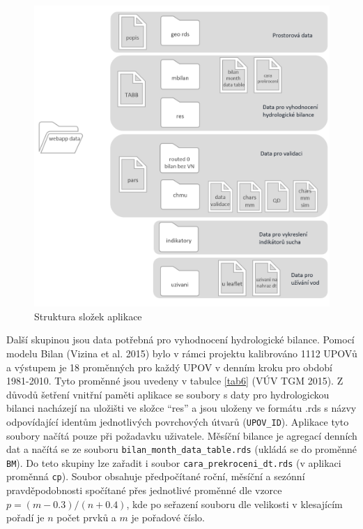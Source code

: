 \documentclass[12pt,]{article}
\begin{document}
\begin{figure}[H]
      \includegraphics[width=\textwidth]{fig/struktura2}
      \caption{Struktura složek aplikace}
      \label{fig:ch5.1}
\end{figure}

\qquad Další skupinou jsou data potřebná pro vyhodnocení hydrologické
bilance. Pomocí modelu Bilan (Vizina et al. 2015) bylo v rámci projektu
kalibrováno 1112 UPOVů a výstupem je 18 proměnných pro každý UPOV v
denním kroku pro období 1981-2010. Tyto proměnné jsou uvedeny v tabulce
\ref{tab6} (VÚV TGM 2015). Z důvodů šetření vnitřní paměti aplikace se
soubory s daty pro hydrologickou bilanci nacházejí na uložišti ve složce
\enquote{res} a jsou uloženy ve formátu .rds s názvy odpovídající
identům jednotlivých povrchových útvarů (\texttt{UPOV\_ID}). Aplikace
tyto soubory načítá pouze při požadavku uživatele. Měsíční bilance je
agregací denních dat a načítá se ze souboru
\texttt{bilan\_month\_data\_table.rds} (ukládá se do proměnné
\texttt{BM}). Do teto skupiny lze zařadit i soubor
\texttt{cara\_prekroceni\_dt.rds} (v aplikaci proměnná \texttt{cp}).
Soubor obsahuje předpočítané roční, měsíční a sezónní pravděpodobnosti
spočítané přes jednotlivé proměnné dle vzorce \(p = (m-0.3)/(n+0.4)\),
kde po seřazení souboru dle velikosti v klesajícím pořadí je \(n\) počet
prvků a \(m\) je pořadové číslo.
\end{document}
